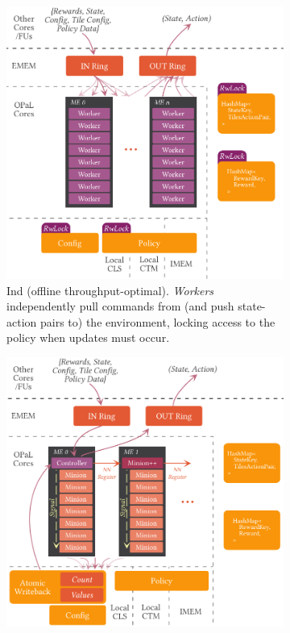 \documentclass[sigconf,natbib=false]{acmart}
\newcommand{\Indfw}{Ind}
\begin{document}
\begin{figure}
	\centering
	\begin{subfigure}{0.45\linewidth}
		\centering
		\includegraphics[keepaspectratio, width=0.9\linewidth]{figures/ind}
		\caption{\Indfw{} (offline throughput-optimal). \emph{Workers} independently pull commands from (and push state-action pairs to) the environment, locking access to the policy when updates must occur.\label{fig:single-and-parallel:single}}
	\end{subfigure}
	\hspace{0.04\linewidth}
	\begin{subfigure}{0.45\linewidth}
		\centering
		\includegraphics[keepaspectratio, width=0.9\linewidth]{figures/coop}

\end{subfigure}
\end{figure}
\end{document}
